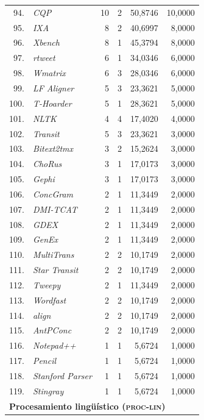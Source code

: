 \begin{longtable}{@{} r p{5cm} r r r r @{}}
94. & \textit{CQP} & 10 & 2 & 50{,}8746 & 10{,}0000 \\
95. & \textit{IXA} & 8 & 2 & 40{,}6997 & 8{,}0000 \\
96. & \textit{Xbench} & 8 & 1 & 45{,}3794 & 8{,}0000 \\
97. & \textit{rtweet} & 6 & 1 & 34{,}0346 & 6{,}0000 \\
98. & \textit{Wmatrix} & 6 & 3 & 28{,}0346 & 6{,}0000 \\
99. & \textit{LF Aligner} & 5 & 3 & 23{,}3621 & 5{,}0000 \\
100. & \textit{T-Hoarder} & 5 & 1 & 28{,}3621 & 5{,}0000 \\
101. & \textit{NLTK} & 4 & 4 & 17{,}4020 & 4{,}0000 \\
102. & \textit{Transit} & 5 & 3 & 23{,}3621 & 3{,}0000 \\
103. & \textit{Bitext2tmx} & 3 & 2 & 15{,}2624 & 3{,}0000 \\
104. & \textit{ChoRus} & 3 & 1 & 17{,}0173 & 3{,}0000 \\
105. & \textit{Gephi} & 3 & 1 & 17{,}0173 & 3{,}0000 \\
106. & \textit{ConcGram} & 2 & 1 & 11{,}3449 & 2{,}0000 \\
107. & \textit{DMI-TCAT} & 2 & 1 & 11{,}3449 & 2{,}0000 \\
108. & \textit{GDEX} & 2 & 1 & 11{,}3449 & 2{,}0000 \\
109. & \textit{GenEx} & 2 & 1 & 11{,}3449 & 2{,}0000 \\
110. & \textit{MultiTrans} & 2 & 2 & 10{,}1749 & 2{,}0000 \\
111. & \textit{Star Transit} & 2 & 2 & 10{,}1749 & 2{,}0000 \\
112. & \textit{Tweepy} & 2 & 1 & 11{,}3449 & 2{,}0000 \\
113. & \textit{Wordfast} & 2 & 2 & 10{,}1749 & 2{,}0000 \\
114. & \textit{align} & 2 & 2 & 10{,}1749 & 2{,}0000 \\
115. & \textit{AntPConc} & 2 & 2 & 10{,}1749 & 2{,}0000 \\
116. & \textit{Notepad++} & 1 & 1 & 5{,}6724 & 1{,}0000 \\
117. & \textit{Pencil} & 1 & 1 & 5{,}6724 & 1{,}0000 \\
118. & \textit{Stanford Parser} & 1 & 1 & 5{,}6724 & 1{,}0000 \\
119. & \textit{Stingray} & 1 & 1 & 5{,}6724 & 1{,}0000 \\
\midrule
\multicolumn{6}{l}{\textbf{Procesamiento lingüístico (\textsc{proc-lin})}} \\

\end{longtable}
